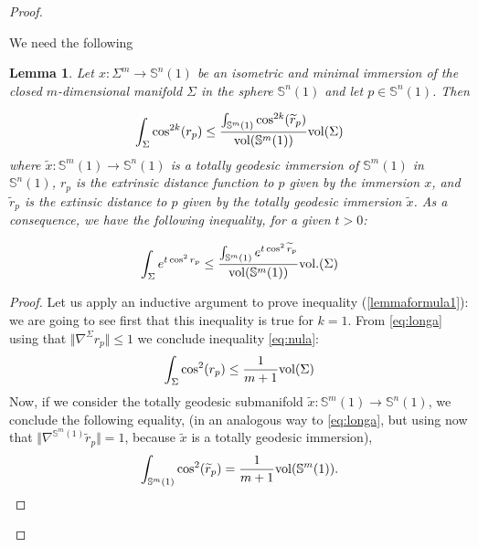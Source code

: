 \documentclass{amsart}
\newtheorem{lemma}[theorem]{Lemma}
\theoremstyle{definition}
\theoremstyle{remark}
\newcommand{\ese}{\mathbb{S}}
\begin{document}
\begin{proof}\

We need the following 

\begin{lemma}\label{keylemaimm}
Let  $x: \Sigma^m \to \mathbb{S}^n(1)$ be an isometric and minimal immersion of the closed $m$-dimensional manifold $\Sigma$ in the sphere  $\mathbb{S}^n(1)$ and let $p\in \mathbb{S}^n(1)$. Then

\begin{equation}\label{lemmaformula1}
\int_\Sigma \cos^{2k}(r_p) \leq \frac{\int_{\mathbb{S}^m(1)} \cos^{2k}(\widetilde{r}_p)}{{\rm vol}(\mathbb{S}^m(1))} {\rm vol}(\Sigma)
\end{equation}
where  $\widetilde{x}: \mathbb{S}^m(1) \rightarrow \mathbb{S}^n(1)$ is a totally geodesic immersion of $\ese^m(1)$ in $\ese^n(1)$, $r_p$ is the extrinsic distance function to $p$ given by the immersion $x$, and $\widetilde{r}_p$ is the extinsic distance to $p$ given by the totally geodesic immersion $\widetilde{x}$. As a consequence, we have the following inequality,  for a given $t>0$:

\begin{equation}\label{lemmaformula2}
\int_{\Sigma} e^{t \cos^2r_p}  \leq\frac{\int_{\ese^m(1)} e^{t \cos^2\widetilde{r}_p}}{{\rm vol}(\mathbb{S}^m(1))} {\rm vol}.(\Sigma)
\end{equation}
\end{lemma}
\begin{proof}

Let us apply an inductive argument to prove inequality (\ref{lemmaformula1}): we are going to see first that this inequality is true for $k=1$.  From \eqref{eq:longa} using that $\Vert \nabla^\Sigma r_p\Vert\leq 1$ we conclude inequality \eqref{eq:nula}:
$$
\int_\Sigma \cos^2(r_p) \leq \frac{1}{m+1} {\rm vol}(\Sigma)
$$
Now, if we consider the totally geodesic submanifold $\widetilde{x}: \mathbb{S}^m(1) \rightarrow \mathbb{S}^n(1)$, we conclude the following equality, (in an analogous way  to \eqref{eq:longa}, but using now that $\Vert\nabla^{\mathbb{S}^m(1)} \widetilde{r}_p\Vert=1$, because $\widetilde{x}$ is a totally geodesic immersion), 
\begin{equation}\label{eqcinc}
\int_{\mathbb{S}^m(1)} \cos^2(\widetilde{r}_p) = \frac{1}{m+1} {\rm vol}(\mathbb{S}^m(1)).
\end{equation}


\end{proof}
\end{proof}
\end{document}
